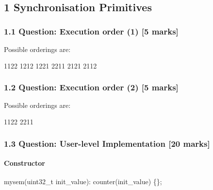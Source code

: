\documentclass[
]{article}
\author{}
\date{}
\newenvironment{Shaded}{}{}
\newcommand{\DataTypeTok}[1]{\textcolor[rgb]{0.56,0.13,0.00}{#1}}
\newcommand{\DecValTok}[1]{\textcolor[rgb]{0.25,0.63,0.44}{#1}}
\newcommand{\NormalTok}[1]{#1}
\newcommand{\OperatorTok}[1]{\textcolor[rgb]{0.40,0.40,0.40}{#1}}
\begin{document}
\subsection{1 Synchronisation
Primitives}\label{synchronisation-primitives}

\subsubsection{1.1 Question: Execution order (1) {[}5
marks{]}}\label{question-execution-order-1-5-marks}

Possible orderings are:

\begin{Shaded}
\begin{Highlighting}[]
\DecValTok{1122}
\DecValTok{1212}
\DecValTok{1221}
\DecValTok{2211}
\DecValTok{2121}
\DecValTok{2112}
\end{Highlighting}
\end{Shaded}

\subsubsection{1.2 Question: Execution order (2) {[}5
marks{]}}\label{question-execution-order-2-5-marks}

Possible orderings are:

\begin{Shaded}
\begin{Highlighting}[]
\DecValTok{1122}
\DecValTok{2211}
\end{Highlighting}
\end{Shaded}

\subsubsection{1.3 Question: User-level Implementation {[}20
marks{]}}\label{question-user-level-implementation-20-marks}

\paragraph{Constructor}\label{constructor}

\begin{Shaded}
\begin{Highlighting}[]
\NormalTok{mysem}\OperatorTok{(}\DataTypeTok{uint32\_t}\NormalTok{ init\_value}\OperatorTok{):}\NormalTok{ counter}\OperatorTok{(}\NormalTok{init\_value}\OperatorTok{)} \OperatorTok{\{\};}
\end{Highlighting}
\end{Shaded}
\end{document}
